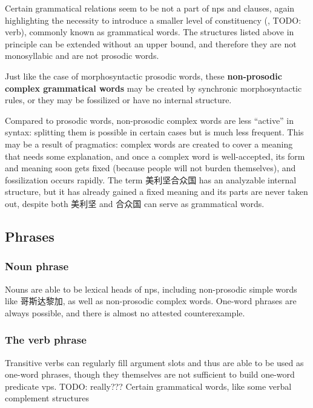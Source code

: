 \documentclass[UTF8, a4paper, oneside, scheme=plain]{ctexrep}
\newcommand*{\concept}[1]{\textbf{#1}}
\begin{document}
Certain grammatical relations seem to be not a part of \ac{np}s and clauses,
again highlighting the necessity to introduce a smaller level of constituency
(, TODO: verb),
commonly known as grammatical words.
The structures listed above in principle 
can be extended without an upper bound, 
and therefore they are not monosyllabic and are not prosodic words.

Just like the case of morphosyntactic prosodic words,
these \concept{non-prosodic complex grammatical words} 
may be created by synchronic morphosyntactic rules,
or they may be fossilized or have no internal structure.

Compared to prosodic words,
non-prosodic complex words are less ``active'' in syntax:
splitting them is possible in certain cases
but is much less frequent.
This may be a result of pragmatics:
complex words are created to cover a meaning that needs some explanation,
and once a complex word is well-accepted,
its form and meaning soon gets fixed 
(because people will not burden themselves),
and fossilization occurs rapidly.
The term 美利坚合众国 has an analyzable internal structure,
but it has already gained a fixed meaning 
and its parts are never taken out,
despite both 美利坚 and 合众国 can serve as grammatical words.


\subsection{Phrases}

\subsubsection{Noun phrase}

Nouns are able to be lexical heads of \acs{np}s,
including non-prosodic simple words like 哥斯达黎加,
as well as non-prosodic complex words.
One-word phrases are always possible,
and there is almost no attested counterexample.

\subsubsection{The verb phrase}

Transitive verbs can regularly fill argument slots 
and thus are able to be used as one-word phrases,
though they themselves are not sufficient to build one-word predicate \ac{vp}s. TODO: really???
Certain grammatical words,
like some verbal complement structures 
\end{document}
